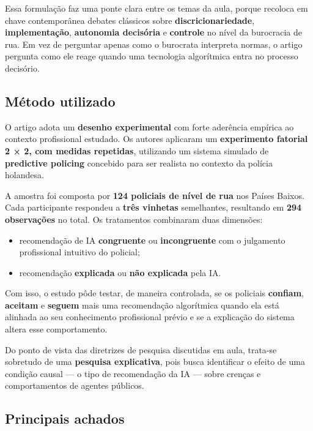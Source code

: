 \documentclass[12pt]{article}
\begin{document}
Essa formulação faz uma ponte clara entre os temas da aula, porque recoloca em chave contemporânea debates clássicos sobre \textbf{discricionariedade}, \textbf{implementação}, \textbf{autonomia decisória} e \textbf{controle} no nível da burocracia de rua. Em vez de perguntar apenas como o burocrata interpreta normas, o artigo pergunta como ele reage quando uma tecnologia algorítmica entra no processo decisório.

\subsection{Método utilizado}
\label{sec:orgcc0d1e6}

O artigo adota um \textbf{desenho experimental} com forte aderência empírica ao contexto profissional estudado. Os autores aplicaram um \textbf{experimento fatorial 2 × 2, com medidas repetidas}, utilizando um sistema simulado de \textbf{predictive policing} concebido para ser realista no contexto da polícia holandesa.

A amostra foi composta por \textbf{124 policiais de nível de rua} nos Países Baixos. Cada participante respondeu a \textbf{três vinhetas} semelhantes, resultando em \textbf{294 observações} no total. Os tratamentos combinaram duas dimensões:
\begin{itemize}
\item recomendação de IA \textbf{congruente} ou \textbf{incongruente} com o julgamento profissional intuitivo do policial;
\item recomendação \textbf{explicada} ou \textbf{não explicada} pela IA.
\end{itemize}

Com isso, o estudo pôde testar, de maneira controlada, se os policiais \textbf{confiam}, \textbf{aceitam} e \textbf{seguem} mais uma recomendação algorítmica quando ela está alinhada ao seu conhecimento profissional prévio e se a explicação do sistema altera esse comportamento.

Do ponto de vista das diretrizes de pesquisa discutidas em aula, trata-se sobretudo de uma \textbf{pesquisa explicativa}, pois busca identificar o efeito de uma condição causal — o tipo de recomendação da IA — sobre crenças e comportamentos de agentes públicos.

\subsection{Principais achados}
\label{sec:org1a2f4c2}
\end{document}
